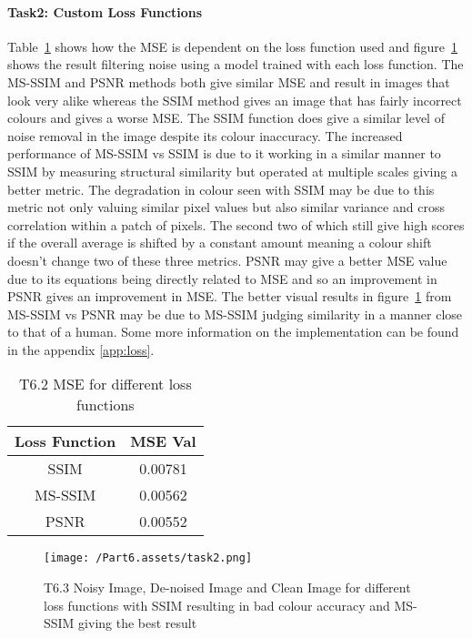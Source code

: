 \documentclass[10pt,twocolumn,letterpaper]{article}
\begin{document}
\paragraph{Task2: Custom Loss Functions}

Table~\ref{table:t62} shows how the MSE is dependent on the loss function used and figure~\ref*{fig:t62} shows the result filtering noise using a model trained with each loss function. The MS-SSIM and PSNR methods both give similar MSE and result in images that look very alike whereas the SSIM method gives an image that has fairly incorrect colours and gives a worse MSE. The SSIM function does give a similar level of noise removal in the image despite its colour inaccuracy. The increased performance of MS-SSIM vs SSIM is due to it working in a similar manner to SSIM by measuring structural similarity but operated at multiple scales giving a better metric\cite{ssim}. The degradation in colour seen with SSIM may be due to this metric not only valuing similar pixel values but also similar variance and cross correlation within a patch of pixels\cite{ssim}. The second two of which still give high scores if the overall average is shifted by a constant amount meaning a colour shift doesn't change two of these three metrics. PSNR may give a better MSE value due to its equations being directly related to MSE and so an improvement in PSNR gives an improvement in MSE\cite{psnr}. The better visual results in figure~\ref*{fig:t62} from MS-SSIM vs PSNR may be due to MS-SSIM judging similarity in a manner close to that of a human\cite{ssim}.
Some more information on the implementation can be found in the appendix \ref*{app:loss}.

\begin{table}[ht]
    \small
    \centering
    \begin{tabular}{|c|c|}
        \hline
        Loss Function & MSE Val \\
        \hline
        SSIM & 0.00781 \\
        MS-SSIM & 0.00562 \\
        PSNR & 0.00552 \\
        \hline
    \end{tabular}
    \medbreak
    \caption{T6.2 MSE for different loss functions}
    \label{table:t62}
    \vspace{-0.8cm}
\end{table}

\begin{figure}[ht]
    \begin{center}
        \texttt{[image: /Part6.assets/task2.png]}
        \caption{T6.3 Noisy Image, De-noised Image and Clean Image for different loss functions with SSIM resulting in bad colour accuracy and MS-SSIM giving the best result}\label{fig:t62}
        \vspace{-0.6cm}
    \end{center}
\end{figure}
\end{document}
